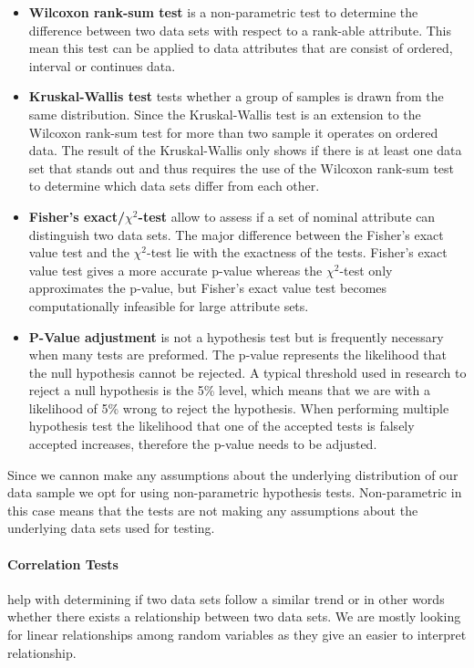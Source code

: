 \begin{itemize}
\item\textbf{Wilcoxon rank-sum test} is a non-parametric test to determine the difference between two data sets with respect to a rank-able attribute.
This mean this test can be applied to data attributes that are consist of ordered, interval or continues data.

\item\textbf{Kruskal-Wallis test} tests whether a group of samples is drawn from the same distribution.
Since the Kruskal-Wallis test is an extension to the Wilcoxon rank-sum test for more than two sample it operates on ordered data.
The result of the Kruskal-Wallis only shows if there is at least one data set that stands out and thus requires the use of the Wilcoxon rank-sum test to determine which data sets differ from each other.

\item\textbf{Fisher's exact/$\chi^2$-test} allow to assess if a set of nominal attribute can distinguish two data sets. 
The major difference between the Fisher's exact value test and the $\chi^2$-test lie with the exactness of the tests.
Fisher's exact value test gives a more accurate p-value whereas the $\chi^2$-test only approximates the p-value, but Fisher's exact value test becomes computationally infeasible for large attribute sets.

\item\textbf{P-Value adjustment} is not a hypothesis test but is frequently necessary when many tests are preformed.
The p-value represents the likelihood that the null hypothesis cannot be rejected.
A typical threshold used in research to reject a null hypothesis is the 5\% level, which means that we are with a likelihood of 5\% wrong to reject the hypothesis.
When performing multiple hypothesis test the likelihood that one of the accepted tests is falsely accepted increases, therefore the p-value needs to be adjusted.
\end{itemize}

Since we cannon make any assumptions about the underlying distribution of our data sample we opt for using non-parametric hypothesis tests.
Non-parametric in this case means that the tests are not making any assumptions about the underlying data sets used for testing.


\paragraph{Correlation Tests} help with determining if two data sets follow a similar trend or in other words whether there exists a relationship between two data sets.
We are mostly looking for linear relationships among random variables as they give an easier to interpret relationship.

